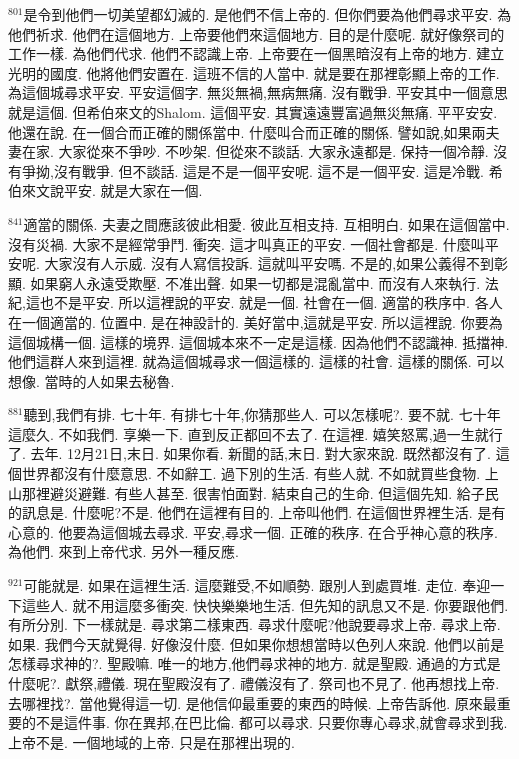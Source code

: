 \documentclass{book}
\begin{document}
$^{801}$是令到他們一切美望都幻滅的.
是他們不信上帝的.
但你們要為他們尋求平安.
為他們祈求.
他們在這個地方.
上帝要他們來這個地方.
目的是什麼呢.
就好像祭司的工作一樣.
為他們代求.
他們不認識上帝.
上帝要在一個黑暗沒有上帝的地方.
建立光明的國度.
他將他們安置在.
這班不信的人當中.
就是要在那裡彰顯上帝的工作.
為這個城尋求平安.
平安這個字.
無災無禍,無病無痛.
沒有戰爭.
平安其中一個意思就是這個.
但希伯來文的Shalom.
這個平安.
其實遠遠豐富過無災無痛.
平平安安.
他還在說.
在一個合而正確的關係當中.
什麼叫合而正確的關係.
譬如說,如果兩夫妻在家.
大家從來不爭吵.
不吵架.
但從來不談話.
大家永遠都是.
保持一個冷靜.
沒有爭拗,沒有戰爭.
但不談話.
這是不是一個平安呢.
這不是一個平安.
這是冷戰.
希伯來文說平安.
就是大家在一個.

$^{841}$適當的關係.
夫妻之間應該彼此相愛.
彼此互相支持.
互相明白.
如果在這個當中.
沒有災禍.
大家不是經常爭鬥.
衝突.
這才叫真正的平安.
一個社會都是.
什麼叫平安呢.
大家沒有人示威.
沒有人寫信投訴.
這就叫平安嗎.
不是的,如果公義得不到彰顯.
如果窮人永遠受欺壓.
不准出聲.
如果一切都是混亂當中.
而沒有人來執行.
法紀,這也不是平安.
所以這裡說的平安.
就是一個.
社會在一個.
適當的秩序中.
各人在一個適當的.
位置中.
是在神設計的.
美好當中,這就是平安.
所以這裡說.
你要為這個城構一個.
這樣的境界.
這個城本來不一定是這樣.
因為他們不認識神.
抵擋神.
他們這群人來到這裡.
就為這個城尋求一個這樣的.
這樣的社會.
這樣的關係.
可以想像.
當時的人如果去秘魯.

$^{881}$聽到,我們有排.
七十年.
有排七十年,你猜那些人.
可以怎樣呢?.
要不就.
七十年這麼久.
不如我們.
享樂一下.
直到反正都回不去了.
在這裡.
嬉笑怒罵,過一生就行了.
去年.
12月21日,末日.
如果你看.
新聞的話,末日.
對大家來說.
既然都沒有了.
這個世界都沒有什麼意思.
不如辭工.
過下別的生活.
有些人就.
不如就買些食物.
上山那裡避災避難.
有些人甚至.
很害怕面對.
結束自己的生命.
但這個先知.
給子民的訊息是.
什麼呢?不是.
他們在這裡有目的.
上帝叫他們.
在這個世界裡生活.
是有心意的.
他要為這個城去尋求.
平安,尋求一個.
正確的秩序.
在合乎神心意的秩序.
為他們.
來到上帝代求.
另外一種反應.

$^{921}$可能就是.
如果在這裡生活.
這麼難受,不如順勢.
跟別人到處買堆.
走位.
奉迎一下這些人.
就不用這麼多衝突.
快快樂樂地生活.
但先知的訊息又不是.
你要跟他們.
有所分別.
下一樣就是.
尋求第二樣東西.
尋求什麼呢?他說要尋求上帝.
尋求上帝.
如果.
我們今天就覺得.
好像沒什麼.
但如果你想想當時以色列人來說.
他們以前是怎樣尋求神的?.
聖殿嘛.
唯一的地方,他們尋求神的地方.
就是聖殿.
通過的方式是什麼呢?.
獻祭,禮儀.
現在聖殿沒有了.
禮儀沒有了.
祭司也不見了.
他再想找上帝.
去哪裡找?.
當他覺得這一切.
是他信仰最重要的東西的時候.
上帝告訴他.
原來最重要的不是這件事.
你在異邦,在巴比倫.
都可以尋求.
只要你專心尋求,就會尋求到我.
上帝不是.
一個地域的上帝.
只是在那裡出現的.
\end{document}
